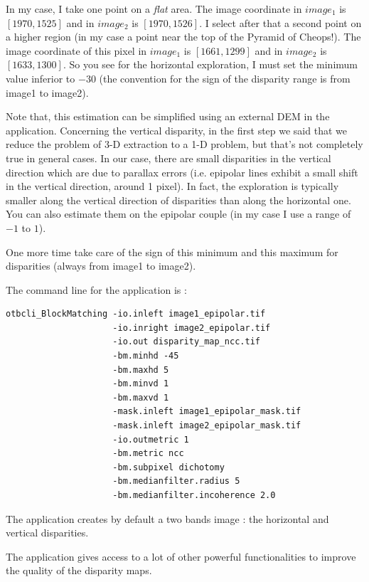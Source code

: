 In my case, I take one point on a \textit{flat} area. The image coordinate in $image_{1}$
is $[1970,1525]$ and in $image_{2}$ is $[1970,1526]$. I select after that a second
point on a higher region (in my case a point near the top of the Pyramid of
Cheops!). The image coordinate of this pixel in $image_{1}$ is $[1661,1299]$ and
in $image_{2}$ is $[1633,1300]$.  So you see for the horizontal exploration, I
must set the minimum value inferior to $-30$ (the convention for the sign of the
disparity range is from image1 to image2).

Note that, this estimation can be simplified using an external DEM in the
 application. Concerning the
vertical disparity, in the first step we said that we reduce the problem of 3-D
extraction to a 1-D problem, but that's not completely true in general cases. In our
case, there are small disparities in the vertical direction which are due to
parallax errors (i.e. epipolar lines exhibit a small shift in the vertical
direction, around 1 pixel). In fact, the exploration is typically smaller along
the vertical direction of disparities than along the horizontal one. You can also estimate
them on the epipolar couple (in my case I use a range of $-1$ to $1$).

One more time take care of the sign of this minimum and this maximum for
disparities (always from image1 to image2).

The command line for the  application is :
\begin{verbatim}
otbcli_BlockMatching -io.inleft image1_epipolar.tif
                     -io.inright image2_epipolar.tif
                     -io.out disparity_map_ncc.tif
                     -bm.minhd -45
                     -bm.maxhd 5
                     -bm.minvd 1
                     -bm.maxvd 1
                     -mask.inleft image1_epipolar_mask.tif
                     -mask.inleft image2_epipolar_mask.tif
                     -io.outmetric 1
                     -bm.metric ncc
                     -bm.subpixel dichotomy
                     -bm.medianfilter.radius 5
                     -bm.medianfilter.incoherence 2.0
\end{verbatim}

The application creates by default a two bands image : the horizontal and
vertical disparities.

The  application gives access to a lot of other
powerful functionalities to improve the quality of the disparity maps.

